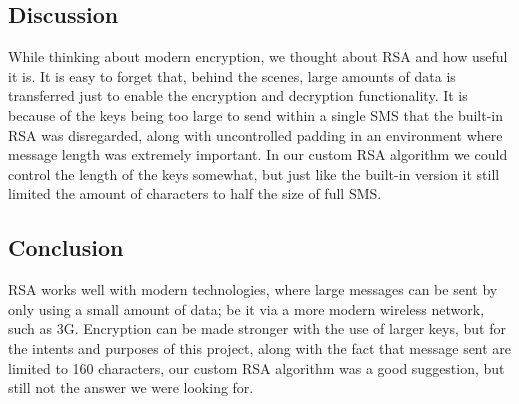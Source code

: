 \subsection*{Discussion}

While thinking about modern encryption, we thought about RSA and how useful it is. It is easy to forget that, behind the scenes, large amounts of data is transferred just to enable the encryption and decryption functionality. It is because of the keys being too large to send within a single SMS that the built-in RSA was disregarded, along with uncontrolled padding in an environment where message length was extremely important. In our custom RSA algorithm we could control the length of the keys somewhat, but just like the built-in version it still limited the amount of characters to half the size of full SMS.
\subsection*{Conclusion}

RSA works well with modern technologies, where large messages can be sent by only using a small amount of data; be it via a more modern wireless network, such as 3G. Encryption can be made stronger with the use of larger keys, but for the intents and purposes of this project, along with the fact that message sent are limited to 160 characters, our custom RSA algorithm was a good suggestion, but still not the answer we were looking for.